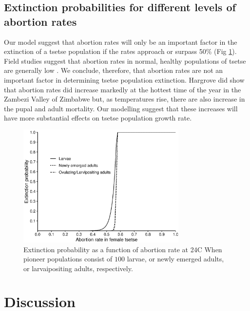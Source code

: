 \documentclass[smallextended]{svjour3}
\begin{document}
\subsection{Extinction probabilities for different levels of abortion rates}
Our model suggest that abortion rates will only be an important factor in the extinction of a tsetse population if the rates approach or surpass 50\% (Fig \ref{fig:6}). Field studies suggest that abortion rates in normal, healthy populations of tsetse are generally low \cite{madubunyi1975technique,madubunyi1978relative,okiwelu1977host,okiwelu1977insemination,turner1984reproductive,hargrove1999reproductive}. We conclude, therefore, that abortion rates are not an important factor in determining tsetse population extinction. Hargrove \cite{hargrove1999reproductive} did show that abortion rates did increase markedly at the hottest time of the year in the Zambezi Valley of Zimbabwe but, as temperatures rise, there are also increase in the pupal and adult mortality. Our modelling suggest that these increases will have more substantial effects on tsetse population growth rate.    
\begin{figure}[h]
	\includegraphics[width=0.75\textwidth]{AbortionRates.eps}
	\caption{{Extinction probability as a function of abortion rate at 24\degree C} When pioneer populations consist of  $100$ larvae,  or  newly emerged adults, or larvaipositing adults, respectively.}
	\label{fig:6}       %
\end{figure}

\section{Discussion}
\end{document}
